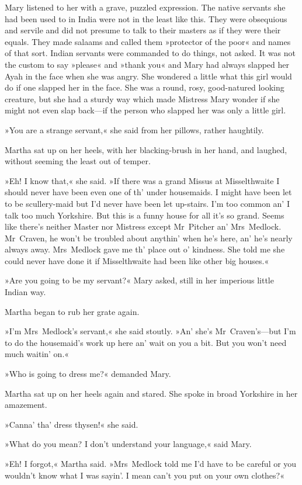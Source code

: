 Mary listened to her with a grave, puzzled expression. The native servants she had been used to in India were not in the least like this. They were obsequious and servile and did not presume to talk to their masters as if they were their equals. They made salaams and called them »protector of the poor« and names of that sort. Indian servants were commanded to do things, not asked. It was not the custom to say »please« and »thank you« and Mary had always slapped her Ayah in the face when she was angry. She wondered a little what this girl would do if one slapped her in the face. She was a round, rosy, good-natured looking creature, but she had a sturdy way which made Mistress Mary wonder if she might not even slap back—if the person who slapped her was only a little girl.

»You are a strange servant,« she said from her pillows, rather haughtily.

Martha sat up on her heels, with her blacking-brush in her hand, and laughed, without seeming the least out of temper.

»Eh! I know that,« she said. »If there was a grand Missus at Misselthwaite I should never have been even one of th' under housemaids. I might have been let to be scullery-maid but I'd never have been let up-stairs. I'm too common an' I talk too much Yorkshire. But this is a funny house for all it's so grand. Seems like there's neither Master nor Mistress except Mr~Pitcher an' Mrs~Medlock. Mr~Craven, he won't be troubled about anythin' when he's here, an' he's nearly always away. Mrs~Medlock gave me th' place out o' kindness. She told me she could never have done it if Misselthwaite had been like other big houses.«

»Are you going to be my servant?« Mary asked, still in her imperious little Indian way.

Martha began to rub her grate again.

»I'm Mrs~Medlock's servant,« she said stoutly. »An' she's Mr~Craven's—but I'm to do the housemaid's work up here an' wait on you a bit. But you won't need much waitin' on.«

»Who is going to dress me?« demanded Mary.

Martha sat up on her heels again and stared. She spoke in broad Yorkshire in her amazement.

»Canna' tha' dress thysen!« she said.

»What do you mean? I don't understand your language,« said Mary.

»Eh! I forgot,« Martha said. »Mrs~Medlock told me I'd have to be careful or you wouldn't know what I was sayin'. I mean can't you put on your own clothes?«

